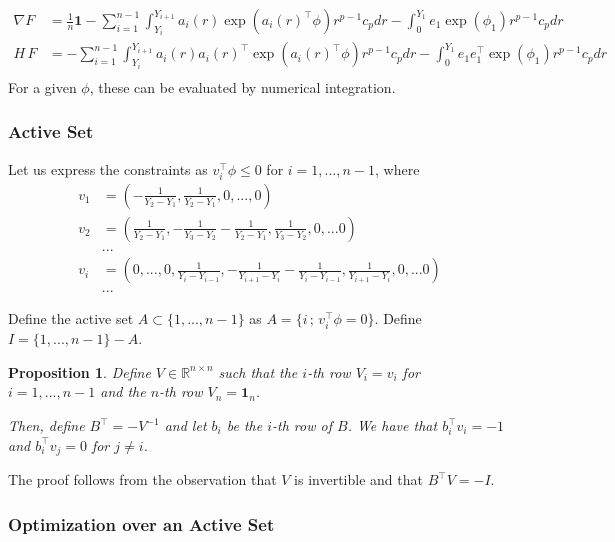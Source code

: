\documentclass[12pt]{article}
\newtheorem{proposition}[theorem]{Proposition}
\begin{document}
\begin{align*}
\nabla F &= \frac{1}{n} \mathbf{1} - \sum_{i=1}^{n-1} \int_{Y_i}^{Y_{i+1}} a_i(r)  
        \exp(a_i(r)^\top \phi) r^{p-1} c_p dr -
             \int_0^{Y_1} e_1 \exp(\phi_1) r^{p-1} c_p dr \\
H \, F &= - \sum_{i=1}^{n-1} \int_{Y_i}^{Y_{i+1}} a_i(r) a_i(r)^\top   
      \exp(a_i(r)^\top \phi) r^{p-1} c_p dr -
             \int_0^{Y_1} e_1 e_1^\top  \exp(\phi_1) r^{p-1} c_p dr \\
\end{align*}
For a given $\phi$, these can be evaluated by numerical integration.



\subsubsection{Active Set}

Let us express the constraints as $v_i^\top \phi \leq 0$ for $i=1,...,n-1$, where
\begin{align*}
v_1 &= ( -\frac{1}{Y_2 - Y_1}, \frac{1}{Y_2 - Y_1}, 0, ..., 0) \\
v_2 &= ( \frac{1}{Y_2 - Y_1}, - \frac{1}{Y_3 - Y_2} - \frac{1}{Y_2 - Y_1}, \frac{1}{Y_3 - Y_2}, 0, ...0 ) \\
  & ... \\
v_i &= (0,...,0,\frac{1}{Y_i - Y_{i-1}}, - \frac{1}{Y_{i+1} - Y_i} - \frac{1}{Y_i - Y_{i-1}}, \frac{1}{Y_{i+1} - Y_i}, 0, ...0 ) \\
 & ... 
\end{align*}


Define the active set $A \subset \{1,...,n-1\}$ as $A = \{ i \,;\, v_i^\top \phi = 0 \}$. Define $I = \{1,...,n-1\} - A$. 

\begin{proposition}
Define $V \in \mathbb{R}^{n \times n}$ such that the $i$-th row $V_i = v_i$ for $i=1,...,n-1$ and the $n$-th row $V_n = \mathbf{1}_n$. 

Then, define $B^\top = -V^{-1}$ and let $b_i$ be the $i$-th row of $B$. We have that $b_i^\top v_i = -1$ and $b_i^\top v_j = 0$ for $j\neq i$. 
\end{proposition}

The proof follows from the observation that $V$ is invertible and that $B^\top V = - I$. 

\subsubsection{Optimization over an Active Set}
\end{document}
